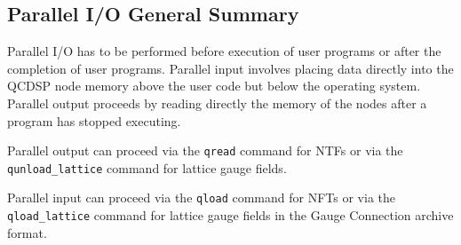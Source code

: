 \subsection{Parallel I/O General Summary} 
Parallel I/O has to be performed before execution of user programs
or after the completion of user programs. Parallel input involves placing
data directly into the QCDSP node memory above the user code but 
below the operating system. Parallel output proceeds by reading directly
the memory of the nodes after a program has stopped executing. 

Parallel output can proceed via the {\tt qread} command for NTFs
or via the {\tt qunload\_lattice} command for lattice gauge fields.

Parallel input can proceed via the {\tt qload} command for NFTs
or via the {\tt qload\_lattice} command for lattice gauge fields in the
Gauge Connection archive format. 

